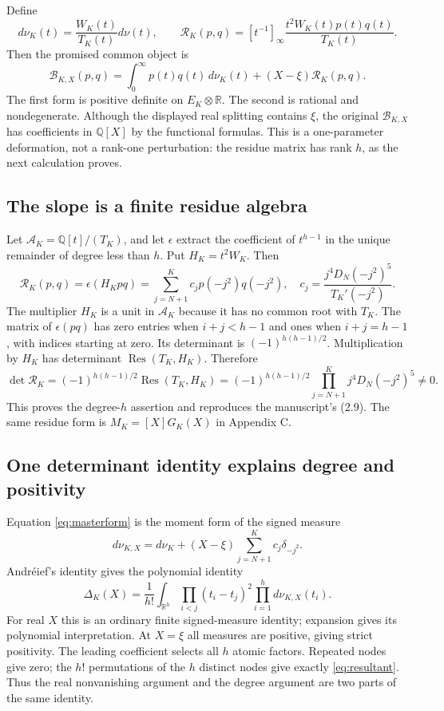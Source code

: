 \documentclass[11pt]{article}
\theoremstyle{definition}
\theoremstyle{remark}\newtheorem*{remark}{Remark}
\newcommand{\Q}{\mathbb Q}
\newcommand{\R}{\mathbb R}
\newcommand{\Res}{\operatorname{Res}}
\newcommand{\pair}{\mathcal B}
\newcommand{\rpair}{\mathcal R}
\begin{document}
Define
\[
 d\nu_K(t)=\frac{W_K(t)}{T_K(t)}d\nu(t),\qquad
 \rpair_K(p,q)=[t^{-1}]_\infty\frac{t^2W_K(t)p(t)q(t)}{T_K(t)}.
\]
Then the promised common object is
\begin{equation}\label{eq:masterform}
 \boxed{\displaystyle
 \pair_{K,X}(p,q)=\int_0^\infty p(t)q(t)\,d\nu_K(t)
                     +(X-\xi)\rpair_K(p,q).}
\end{equation}
The first form is positive definite on $E_K\otimes\R$. The second is rational
and nondegenerate. Although the displayed real splitting contains $\xi$, the
original $\pair_{K,X}$ has coefficients in $\Q[X]$ by the functional formulas.
This is a one-parameter deformation, not a rank-one perturbation: the residue
matrix has rank $h$, as the next calculation proves.

\subsection{The slope is a finite residue algebra}
Let $\mathcal A_K=\Q[t]/(T_K)$, and let $\epsilon$ extract the coefficient of
$t^{h-1}$ in the unique remainder of degree less than $h$. Put $H_K=t^2W_K$.
Then
\begin{equation}\label{eq:frobenius}
 \rpair_K(p,q)=\epsilon(H_Kpq)
 =\sum_{j=N+1}^K c_jp(-j^2)q(-j^2),\quad
 c_j=\frac{j^4D_N(-j^2)^5}{T_K'(-j^2)}.
\end{equation}
The multiplier $H_K$ is a unit in $\mathcal A_K$ because it has no common root
with $T_K$. The matrix of $\epsilon(pq)$ has zero entries when $i+j<h-1$
and ones when $i+j=h-1$, with indices starting at zero. Its determinant is
$(-1)^{h(h-1)/2}$. Multiplication by $H_K$ has determinant
$\Res(T_K,H_K)$. Therefore
\begin{equation}\label{eq:resultant}
 \det\rpair_K=(-1)^{h(h-1)/2}\Res(T_K,H_K)
 =(-1)^{h(h-1)/2}\prod_{j=N+1}^K j^4D_N(-j^2)^5\ne0.
\end{equation}
This proves the degree-$h$ assertion and reproduces the manuscript's (2.9).
The same residue form is $M_K=[X]G_K(X)$ in Appendix C.

\subsection{One determinant identity explains degree and positivity}
Equation \eqref{eq:masterform} is the moment form of the signed measure
\[
 d\nu_{K,X}=d\nu_K+(X-\xi)\sum_{j=N+1}^K c_j\delta_{-j^2}.
\]
Andr\'eief's identity \cite{Andreief} gives the polynomial identity
\begin{equation}\label{eq:andreief}
 \Delta_K(X)=\frac1{h!}\int_{\R^h}
       \prod_{i<j}(t_i-t_j)^2\prod_{i=1}^h d\nu_{K,X}(t_i).
\end{equation}
For real $X$ this is an ordinary finite signed-measure identity; expansion
gives its polynomial interpretation. At $X=\xi$ all measures are positive,
giving strict positivity. The leading coefficient selects all $h$ atomic
factors. Repeated nodes give zero; the $h!$ permutations of the $h$ distinct
nodes give exactly \eqref{eq:resultant}. Thus the real nonvanishing argument and
the degree argument are two parts of the same identity.
\end{document}
